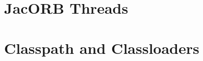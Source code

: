 \documentclass[12pt]{scrbook}
\begin{document}




\chapter{JacORB Threads}
\label{ch:threads}






\chapter{Classpath and Classloaders}
\label{ch:classloader}





{


}
\end{document}
